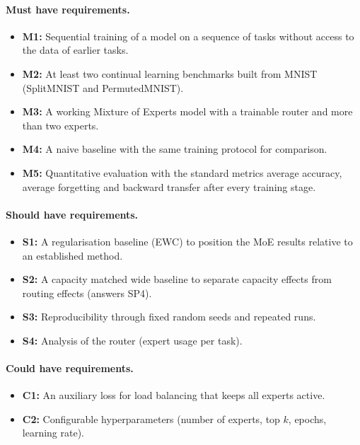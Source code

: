 \paragraph{Must have requirements.}
\begin{itemize}[leftmargin=2em]
  \item \textbf{M1:} Sequential training of a model on a sequence of tasks
        without access to the data of earlier tasks.
  \item \textbf{M2:} At least two continual learning benchmarks built from
        MNIST (SplitMNIST and PermutedMNIST).
  \item \textbf{M3:} A working Mixture of Experts model with a trainable
        router and more than two experts.
  \item \textbf{M4:} A naive baseline with the same training protocol for
        comparison.
  \item \textbf{M5:} Quantitative evaluation with the standard metrics
        average accuracy, average forgetting and backward transfer after
        every training stage.
\end{itemize}

\paragraph{Should have requirements.}
\begin{itemize}[leftmargin=2em]
  \item \textbf{S1:} A regularisation baseline (EWC) to position the MoE
        results relative to an established method.
  \item \textbf{S2:} A capacity matched wide baseline to separate capacity
        effects from routing effects (answers SP4).
  \item \textbf{S3:} Reproducibility through fixed random seeds and
        repeated runs.
  \item \textbf{S4:} Analysis of the router (expert usage per task).
\end{itemize}

\paragraph{Could have requirements.}
\begin{itemize}[leftmargin=2em]
  \item \textbf{C1:} An auxiliary loss for load balancing that keeps all
        experts active.
  \item \textbf{C2:} Configurable hyperparameters (number of experts, top
        $k$, epochs, learning rate).
\end{itemize}

